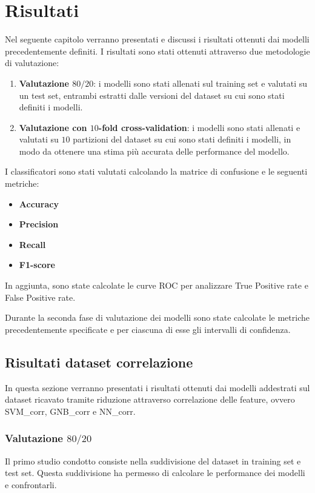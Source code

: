\chapter{Risultati} \label{chp:risultati}
Nel seguente capitolo verranno presentati e discussi i risultati ottenuti dai
modelli precedentemente definiti. I risultati sono stati ottenuti attraverso
due metodologie di valutazione:
\begin{enumerate}
    \item \textbf{Valutazione $80/20$}: i modelli sono stati allenati sul
          training set e valutati su un test set, entrambi estratti dalle versioni del dataset
          su cui sono stati definiti i modelli.
    \item \textbf{Valutazione con $10$-fold cross-validation}: i modelli sono
          stati allenati e valutati su $10$ partizioni del dataset su cui sono stati 
          definiti i modelli, in modo da ottenere una stima più accurata delle 
          performance del modello.
\end{enumerate}

I classificatori sono stati valutati calcolando la matrice di confusione e le
seguenti metriche:
\begin{itemize}
    \item \textbf{Accuracy}
    \item \textbf{Precision}
    \item \textbf{Recall}
    \item \textbf{F1-score}
\end{itemize}

In aggiunta, sono state calcolate le curve ROC per analizzare True Positive rate
e False Positive rate.

Durante la seconda fase di valutazione dei modelli sono state calcolate le
metriche precedentemente specificate e per ciascuna di esse gli intervalli di
confidenza.
\section{Risultati dataset correlazione} \label{sec:risultati_corr}
In questa sezione verranno presentati i risultati ottenuti dai modelli addestrati
sul dataset ricavato tramite riduzione attraverso correlazione delle feature,
ovvero SVM\_corr, GNB\_corr e NN\_corr.

\subsection{Valutazione $80/20$}
Il primo studio condotto consiste nella suddivisione del dataset in training
set e test set. Questa suddivisione ha permesso di calcolare le performance dei
modelli e confrontarli.

